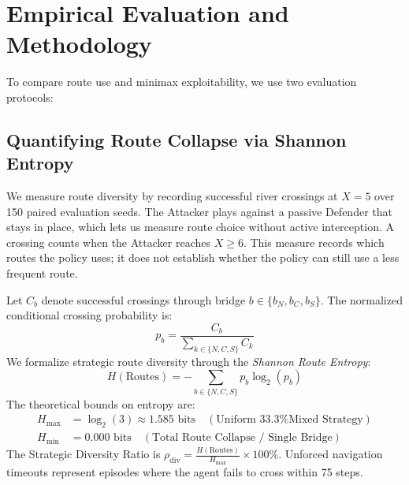 \documentclass[conference]{IEEEtran}
\begin{document}
\section{Empirical Evaluation and Methodology}

To compare route use and minimax exploitability, we use two evaluation protocols:

\subsection{Quantifying Route Collapse via Shannon Entropy}
We measure route diversity by recording successful river crossings at $X=5$ over 150 paired evaluation seeds. The Attacker plays against a passive Defender that stays in place, which lets us measure route choice without active interception. A crossing counts when the Attacker reaches $X \ge 6$. This measure records which routes the policy uses; it does not establish whether the policy can still use a less frequent route.

Let $C_b$ denote successful crossings through bridge $b \in \{b_N, b_C, b_S\}$. The normalized conditional crossing probability is:
\begin{equation}
p_b = \frac{C_b}{\sum_{k \in \{N, C, S\}} C_k}
\end{equation}
We formalize strategic route diversity through the \textit{Shannon Route Entropy}:
\begin{equation}
H(\text{Routes}) = -\sum_{b \in \{N, C, S\}} p_b \log_2(p_b)
\end{equation}
The theoretical bounds on entropy are:
\begin{align}
H_{\max} &= \log_2(3) \approx 1.585 \text{ bits} \quad (\text{Uniform 33.3\% Mixed Strategy}) \\
H_{\min} &= 0.000 \text{ bits} \quad (\text{Total Route Collapse / Single Bridge})
\end{align}
The Strategic Diversity Ratio is $\rho_{\text{div}} = \frac{H(\text{Routes})}{H_{\max}} \times 100\%$. Unforced navigation timeouts represent episodes where the agent fails to cross within 75 steps.
\end{document}

